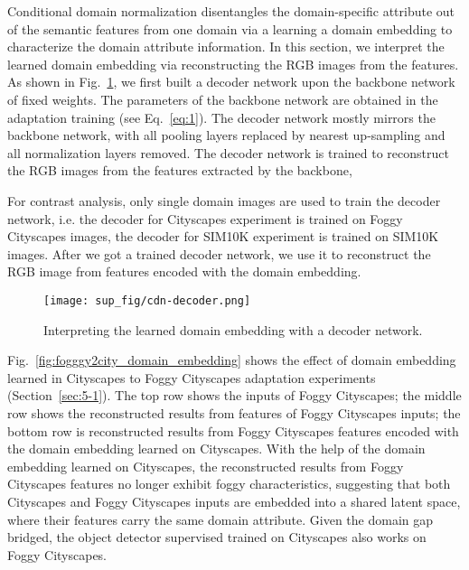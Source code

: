 \documentclass[runningheads]{llncs}
\begin{document}
Conditional domain normalization disentangles the domain-specific attribute out of the semantic features from one domain via a learning a domain embedding to characterize the domain attribute information.
In this section, we interpret the learned domain embedding via reconstructing the RGB images from the features.
As shown in Fig.~\ref{fig:cdn-decoder}, we first built a decoder network  upon the backbone network  of fixed weights.
The parameters of the backbone network are obtained in the adaptation training (see Eq.~\ref{eq:1}).
The decoder network mostly mirrors the backbone network, with all pooling layers replaced by nearest up-sampling and all normalization layers removed.
The decoder network is trained to reconstruct the RGB images from the features extracted by the backbone,

For contrast analysis, only single domain images are used to train the decoder network, i.e. the decoder for Cityscapes experiment is trained on Foggy Cityscapes images, the decoder for SIM10K experiment is trained on SIM10K images.
After we got a trained decoder network, we use it to reconstruct the RGB image from features encoded with the domain embedding.
\begin{figure}
    \centering
    \texttt{[image: sup\_fig/cdn-decoder.png]}
    \caption{Interpreting the learned domain embedding with a decoder network.}
    \label{fig:cdn-decoder}
\end{figure}

Fig.~\ref{fig:fogggy2city_domain_embedding} shows the effect of domain embedding learned in Cityscapes to Foggy Cityscapes adaptation experiments (Section~\ref{sec:5-1}).
The top row shows the inputs of Foggy Cityscapes;
the middle row shows the reconstructed results from features of Foggy Cityscapes inputs;
the bottom row is reconstructed results from Foggy Cityscapes features encoded with the domain embedding learned on Cityscapes.
With the help of the domain embedding learned on Cityscapes, the reconstructed results from Foggy Cityscapes features no longer exhibit foggy characteristics, suggesting that both Cityscapes and Foggy Cityscapes inputs are embedded into a shared latent space, where their features carry the same domain attribute.
Given the domain gap bridged, the object detector supervised trained on Cityscapes also works on Foggy Cityscapes.
\end{document}
